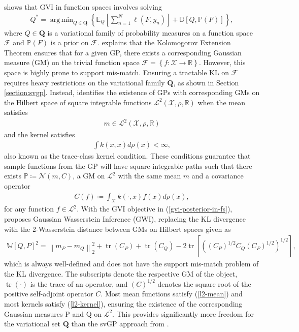 \documentclass{article}
\newcommand{\tr}{\operatorname{tr}}
\DeclareMathOperator*{\argmin}{arg\,min}
\numberwithin{equation}{section}
\begin{document}
\cite{wild2022generalized} shows that GVI in function spaces involves solving
\begin{align}
    Q^* = \argmin_{Q \in \boldsymbol{Q}} \left\{\mathbb{E}_{Q}\left[\sum_{n=1}^{N}\ell(F, y_n)\right] + \mathbb{D}\left[Q, \mathbb{P}(F)\right]\right\},
    \label{gvi-posterior-in-fs}
\end{align}
where $Q \in \boldsymbol{Q}$ is a variational family of probability measures on a function space $\boldsymbol{\mathcal{F}}$ and $\mathbb{P}(F)$ is a prior on $\boldsymbol{\mathcal{F}}$.
\cite{wild2022generalized} explains that the Kolomogorov Extension Theorem ensures that for a given GP, there exists a corresponding Gaussian measure (GM) on the trivial function space $\boldsymbol{\mathcal{F}} = \left\{f: \mathcal{X} \rightarrow \mathbb{R}\right\}$.
However, this space is highly prone to support mis-match.
Ensuring a tractable KL on $\boldsymbol{\mathcal{F}}$ requires heavy restrictions on the variational family $\boldsymbol{Q}$, as shown in Section \ref{section:svgp}.
Instead, \cite{wild2022generalized} identifies the existence of GPs with corresponding GMs on the Hilbert space of square integrable functions $\mathcal{L}^2\left(\mathcal{X}, \rho, \mathbb{R}\right)$ when the mean satisfies
\begin{align}
    m \in \mathcal{L}^2\left(\mathcal{X}, \rho, \mathbb{R}\right)
    \label{l2-mean}
\end{align}
and the kernel satisfies
\begin{align}
    \int k(x, x) d\rho(x) < \infty,
    \label{l2-kernel}
\end{align}
also known as the trace-class kernel condition.
These conditions guarantee that sample functions from the GP will have square-integrable paths such that there exists $\mathbb{P} \coloneqq \mathcal{N}(m, C)$, a GM on $\mathcal{L}^2$ with the same mean $m$ and a covariance operator
\begin{align}
    C(f) \coloneqq \int_{\mathcal{X}} k(\cdot, x) f(x) d\rho(x),
\end{align}
for any function $f \in \mathcal{L}^2$.
With the GVI objective in (\ref{gvi-posterior-in-fs}), \cite{wild2022generalized} proposes Gaussian Wasserstein Inference (GWI), replacing the KL divergence with the 2-Wasserstein distance between GMs on Hilbert spaces given as
\begin{align}
    \mathbb{W}\left[Q, P\right]^2 = \left\|m_P - m_Q\right\|_2^2 + \tr\left(C_P\right) + \tr\left(C_Q\right) - 2 \tr \left[\left(\left(C_P\right)^{1/2} C_Q \left(C_P\right)^{1/2} \right)^{1/2}\right],
    \label{wasserstein-distance}
\end{align}
which is always well-defined and does not have the support mis-match problem of the KL divergence.
The subscripts denote the respective GM of the object, $\tr(\cdot)$ is the trace of an operator, and $(C)^{1/2}$ denotes the square root of the positive self-adjoint operator $C$.
Most mean functions satisfy (\ref{l2-mean}) and most kernels satisfy (\ref{l2-kernel}), ensuring the existence of the corresponding Gaussian measures P and Q on $\mathcal{L}^2$.
This provides significantly more freedom for the variational set $\boldsymbol{Q}$ than the svGP approach from \cite{titsias2009variational}.
\end{document}
